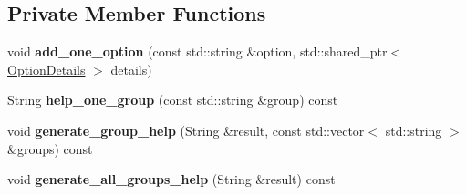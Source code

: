 \subsection*{Private Member Functions}
\begin{DoxyCompactItemize}
\item 
void {\bfseries add\+\_\+one\+\_\+option} (const std\+::string \&option, std\+::shared\+\_\+ptr$<$ \hyperlink{classcxxopts_1_1OptionDetails}{Option\+Details} $>$ details)\hypertarget{classcxxopts_1_1Options_ae7b46ef08703ebc2bcccb41a08b2283c}{}\label{classcxxopts_1_1Options_ae7b46ef08703ebc2bcccb41a08b2283c}

\item 
String {\bfseries help\+\_\+one\+\_\+group} (const std\+::string \&group) const \hypertarget{classcxxopts_1_1Options_a9f5dfe49398e0b6ebeaa15530b3113cb}{}\label{classcxxopts_1_1Options_a9f5dfe49398e0b6ebeaa15530b3113cb}

\item 
void {\bfseries generate\+\_\+group\+\_\+help} (String \&result, const std\+::vector$<$ std\+::string $>$ \&groups) const \hypertarget{classcxxopts_1_1Options_a332a41d1674664950f18c20f1f1120ef}{}\label{classcxxopts_1_1Options_a332a41d1674664950f18c20f1f1120ef}

\item 
void {\bfseries generate\+\_\+all\+\_\+groups\+\_\+help} (String \&result) const \hypertarget{classcxxopts_1_1Options_ade49018dbc5c982209ab0d08faf69f6b}{}\label{classcxxopts_1_1Options_ade49018dbc5c982209ab0d08faf69f6b}

\end{DoxyCompactItemize}
